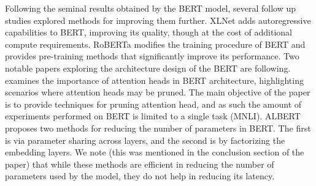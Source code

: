 \documentclass[11pt,a4paper]{article}
\begin{document}
Following the seminal results obtained by the BERT model, several follow up studies explored methods for improving them further. XLNet \citep{yang2019xlnet} adds autoregressive capabilities to BERT, improving its quality, though at the cost of additional compute requirements. RoBERTa \citep{liu2019roberta} modifies the training procedure of BERT and provides pre-training methods that significantly improve its performance. Two notable papers exploring the architecture design of the BERT are following. \citet{michel2019sixteen} examines the importance of attention heads in BERT architecture, highlighting scenarios where attention heads may be pruned. The main objective of the paper is to provide techniques for pruning attention head, and as such the amount of experiments performed on BERT is limited to a single task (MNLI). ALBERT \citep{lan2019albert} proposes two methods for reducing the number of parameters in BERT. The first is via parameter sharing across layers, and the second is by factorizing the embedding layers. We note (this was mentioned in the conclusion section of the paper) that while these methods are efficient in reducing the number of parameters used by the model, they do not help in reducing its latency. 
\end{document}
